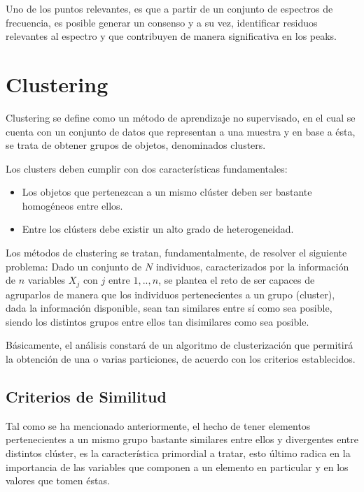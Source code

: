 Uno de los puntos relevantes, es que a partir de un conjunto de espectros de frecuencia, es posible generar un consenso y a su vez, identificar residuos relevantes al espectro y que contribuyen de manera significativa en los peaks.

\section{Clustering}

Clustering se define como un método de aprendizaje no supervisado, en el cual se cuenta con un conjunto de datos que representan a una muestra y en base a ésta, se trata de obtener grupos de objetos, denominados clusters.

Los clusters deben cumplir con dos características fundamentales:

\begin{itemize}
	\item Los objetos que pertenezcan a un mismo clúster deben ser bastante homogéneos entre ellos.
	\item Entre los clústers debe existir un alto grado de heterogeneidad.
\end{itemize}

Los métodos de clustering se tratan, fundamentalmente, de resolver el siguiente problema: Dado un conjunto de $N$ individuos, caracterizados por la información de $n$ variables $X_{j}$ con $j$ entre $1,..,n$, se plantea el reto de ser capaces de agruparlos de manera que los individuos pertenecientes a un grupo (cluster), dada la información disponible, sean tan similares entre sí como sea posible, siendo los distintos grupos entre ellos tan disimilares como sea posible.

Básicamente, el análisis constará de un algoritmo de clusterización que permitirá la obtención de una o varias particiones, de acuerdo con los criterios establecidos.

\subsection{Criterios de Similitud}

Tal como se ha mencionado anteriormente, el hecho de tener elementos pertenecientes a un mismo grupo bastante similares entre ellos y divergentes entre distintos clúster, es la característica primordial a tratar, esto último radica en la importancia de las variables que componen a un elemento en particular y en los valores que tomen éstas.

